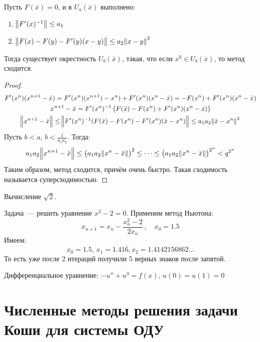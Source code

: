 \begin{theorem}
	Пусть $F(\bar x) = 0$, и в $U_a(\bar x)$ выполнено:\begin{enumerate}
		\item $\norm{F'(x)^{-1}} \leq a_1$
		\item $\norm{F(x) - F(y) - F'(y)(x - y)} \leq a_2 \norm{x - y}^2$
	\end{enumerate}
	Тогда существует окрестность $U_b(\bar x)$, такая, что если $x^0 \in U_b(\bar x)$, то метод сходится.
\end{theorem}
\begin{proof}
	\begin{gather*}
		F'(x^n)(x^{n + 1} - \bar x) = F'(x^n) (x^{n + 1}) - x^n) + F'(x^n) (x^n - \bar x) = -F(x^n) + F'(x^n) (x^n - \bar x) \\
		x^{n+1} - \bar x = F'(x^n)^{-1} \left(F(\bar x) - F(x^n) + F'(x^n) (x^n - \bar x)\right) \\
		\norm{x^{n+1} - \bar x} \leq \norm{F'(x^n)^{-1} (F(\bar x) - F(x^n) - F'(x^n) (\bar x - x^n)} \leq a_1 a_2 \norm{\bar x - x^n}^2
	\end{gather*}
	Пусть $b < a$, $b < \frac{1}{a_1 a_2}$. Тогда:
	\[ a_1 a_2 \norm{x^{n+1} - \bar x} \leq \left(a_1 a_2 \norm{x^{n} - \bar x} \right)^2 \leq \dotsb \leq \left(a_1 a_2 \norm{x^{n} - \bar x} \right)^{2^n} < q^{2^n} \]
	Таким образом, метод сходится, причём очень быстро. Такая сходимость называется суперсходимостью.
\end{proof}

\begin{example} Вычисление $\sqrt{2}$.

	Задача — решить уравнение $x^2 - 2 = 0$. Применим метод Ньютона:
	\[ x_{n+1} = x_n - \frac{x_n^2 - 2}{2 x_n} \,,\quad x_0 = 1.5 \]
	Имеем:
	\[ x_0 = 1.5,\, x_1 = 1.41\overline{6}, x_2 = 1.4142156862\dotso \]
	То есть уже после 2 итераций получили 5 верных знаков после запятой.
\end{example}

\begin{example} Дифференциальное уравнение: $-u'' + u^3 = f(x)$, $u(0) = u(1) = 0$
\end{example}

\section{Численные методы решения задачи Коши для системы ОДУ}
